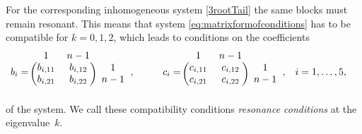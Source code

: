 \documentclass{article}
\theoremstyle{plain}
\begin{document}
For the corresponding  inhomogeneous system \eqref{3rootTail} the same blocks must remain resonant. This means that system \eqref{eq:matrixformofconditions} has to be compatible for $k = 0,1,2$, which leads to conditions on the coefficients 
\begin{align}
    b_i
    &= 
    \begin{blockarray}{ccc}
      1 & n - 1 &  \\
    \begin{block}{(cc)c}
      b_{i, 11} & b_{i, 12} & 1  \\
      b_{i, 21} & b_{i, 22} & n - 1  \\
    \end{block}
    \end{blockarray},  \qquad 
    &
    c_i
    &= 
    \begin{blockarray}{ccc}
      1 & n - 1 &  \\
    \begin{block}{(cc)c}
      c_{i, 11} & c_{i, 12} & 1  \\
      c_{i, 21} & c_{i, 22} & n - 1  \\
    \end{block}
    \end{blockarray},
    &
    i 
    &= 1, \dots, 5,
\end{align} 
of the system.
We call these compatibility conditions {\it resonance conditions} at the eigenvalue~$k$.
\end{document}
